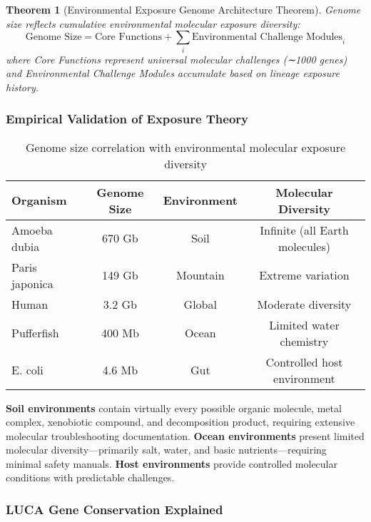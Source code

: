 \documentclass[12pt,a4paper]{article}
\newtheorem{theorem}{Theorem}[section]
\begin{document}
\begin{theorem}[Environmental Exposure Genome Architecture Theorem]
Genome size reflects cumulative environmental molecular exposure diversity:
\begin{equation}
\text{Genome Size} = \text{Core Functions} + \sum_{i} \text{Environmental Challenge Modules}_i
\end{equation}
where Core Functions represent universal molecular challenges (∼1000 genes) and Environmental Challenge Modules accumulate based on lineage exposure history.
\end{theorem}

\subsubsection{Empirical Validation of Exposure Theory}

\begin{table}[h]
\centering
\begin{tabular}{lccc}
\toprule
Organism & Genome Size & Environment & Molecular Diversity \\
\midrule
Amoeba dubia & 670 Gb & Soil & Infinite (all Earth molecules) \\
Paris japonica & 149 Gb & Mountain & Extreme variation \\
Human & 3.2 Gb & Global & Moderate diversity \\
Pufferfish & 400 Mb & Ocean & Limited water chemistry \\
E. coli & 4.6 Mb & Gut & Controlled host environment \\
\bottomrule
\end{tabular}
\caption{Genome size correlation with environmental molecular exposure diversity}
\end{table}

\textbf{Soil environments} contain virtually every possible organic molecule, metal complex, xenobiotic compound, and decomposition product, requiring extensive molecular troubleshooting documentation. \textbf{Ocean environments} present limited molecular diversity—primarily salt, water, and basic nutrients—requiring minimal safety manuals. \textbf{Host environments} provide controlled molecular conditions with predictable challenges.

\subsubsection{LUCA Gene Conservation Explained}
\end{document}
